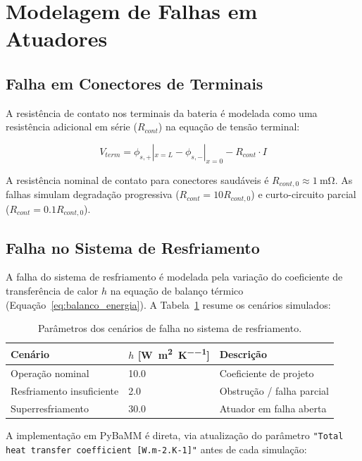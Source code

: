\documentclass[
    12pt,
    openright,
    twoside,
    a4paper,
    brazil,
    english
]{abntex2}
\begin{document}
\section{Modelagem de Falhas em Atuadores}

\subsection{Falha em Conectores de Terminais}

A resistência de contato nos terminais da bateria é modelada como uma resistência
adicional em série ($R_{cont}$) na equação de tensão terminal:

\begin{equation}
  V_{term} = \phi_{s,+}|_{x=L} - \phi_{s,-}|_{x=0} - R_{cont} \cdot I
\end{equation}

A resistência nominal de contato para conectores saudáveis é
$R_{cont,0} \approx \SI{1}{\milli\ohm}$. As falhas simulam degradação
progressiva ($R_{cont} = 10R_{cont,0}$) e curto-circuito parcial
($R_{cont} = 0.1R_{cont,0}$).

\subsection{Falha no Sistema de Resfriamento}

A falha do sistema de resfriamento é modelada pela variação do coeficiente de
transferência de calor $h$ na equação de balanço térmico (Equação~\ref{eq:balanco_energia}).
A Tabela~\ref{tab:falhas_resfriamento} resume os cenários simulados:

\begin{table}[htb]
  \centering
  \caption{Parâmetros dos cenários de falha no sistema de resfriamento.}
  \label{tab:falhas_resfriamento}
  \begin{tabular}{lll}
    \toprule
    \textbf{Cenário}         & \textbf{$h$ [\si{\watt\per\meter\squared\per\kelvin}]} & \textbf{Descrição} \\
    \midrule
    Operação nominal         & 10.0  & Coeficiente de projeto \\
    Resfriamento insuficiente & 2.0  & Obstrução / falha parcial \\
    Superresfriamento        & 30.0  & Atuador em falha aberta \\
    \bottomrule
  \end{tabular}
\end{table}

A implementação em PyBaMM é direta, via atualização do parâmetro
\texttt{"Total heat transfer coefficient [W.m-2.K-1]"} antes de cada simulação:
\end{document}
